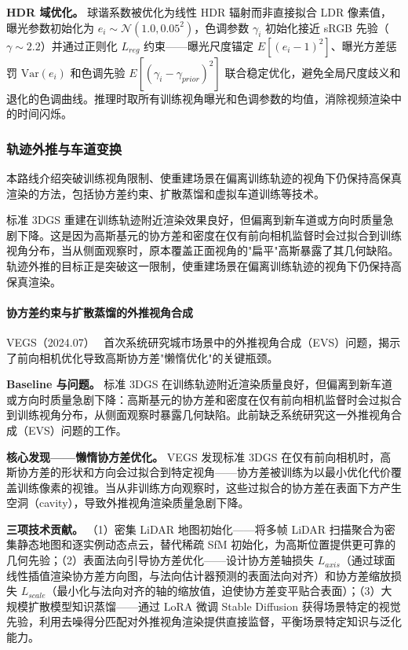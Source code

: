 \textbf{HDR 域优化。} 球谐系数被优化为线性 HDR 辐射而非直接拟合 LDR 像素值，曝光参数初始化为 $e_i \sim \mathcal{N}(1.0, 0.05^2)$，色调参数 $\gamma_i$ 初始化接近 sRGB 先验（$\gamma \sim 2.2$）并通过正则化 $L_{reg}$ 约束——曝光尺度锚定 $E[(e_i-1)^2]$、曝光方差惩罚 $\text{Var}(e_i)$ 和色调先验 $E[(\gamma_i - \gamma_{prior})^2]$ 联合稳定优化，避免全局尺度歧义和退化的色调曲线。推理时取所有训练视角曝光和色调参数的均值，消除视频渲染中的时间闪烁。

\subsubsection{轨迹外推与车道变换}

本路线介绍突破训练视角限制、使重建场景在偏离训练轨迹的视角下仍保持高保真渲染的方法，包括协方差约束、扩散蒸馏和虚拟车道训练等技术。

标准 3DGS 重建在训练轨迹附近渲染效果良好，但偏离到新车道或方向时质量急剧下降。这是因为高斯基元的协方差和密度在仅有前向相机监督时会过拟合到训练视角分布，当从侧面观察时，原本覆盖正面视角的"扁平"高斯暴露了其几何缺陷。轨迹外推的目标正是突破这一限制，使重建场景在偏离训练轨迹的视角下仍保持高保真渲染。

\paragraph{协方差约束与扩散蒸馏的外推视角合成}

VEGS（2024.07）~\cite{2407_02945} 首次系统研究城市场景中的外推视角合成（EVS）问题，揭示了前向相机优化导致高斯协方差"懒惰优化"的关键瓶颈。

\textbf{Baseline 与问题。} 标准 3DGS 在训练轨迹附近渲染质量良好，但偏离到新车道或方向时质量急剧下降：高斯基元的协方差和密度在仅有前向相机监督时会过拟合到训练视角分布，从侧面观察时暴露几何缺陷。此前缺乏系统研究这一外推视角合成（EVS）问题的工作。

\textbf{核心发现——懒惰协方差优化。} VEGS 发现标准 3DGS 在仅有前向相机时，高斯协方差的形状和方向会过拟合到特定视角——协方差被训练为以最小优化代价覆盖训练像素的视锥。当从非训练方向观察时，这些过拟合的协方差在表面下方产生空洞（cavity），导致外推视角渲染质量急剧下降。

\textbf{三项技术贡献。} （1）密集 LiDAR 地图初始化——将多帧 LiDAR 扫描聚合为密集静态地图和逐实例动态点云，替代稀疏 SfM 初始化，为高斯位置提供更可靠的几何先验；（2）表面法向引导协方差优化——设计协方差轴损失 $L_{axis}$（通过球面线性插值渲染协方差方向图，与法向估计器预测的表面法向对齐）和协方差缩放损失 $L_{scale}$（最小化与法向对齐的轴的缩放值，迫使协方差变平贴合表面）；（3）大规模扩散模型知识蒸馏——通过 LoRA 微调 Stable Diffusion 获得场景特定的视觉先验，利用去噪得分匹配对外推视角渲染提供直接监督，平衡场景特定知识与泛化能力。

